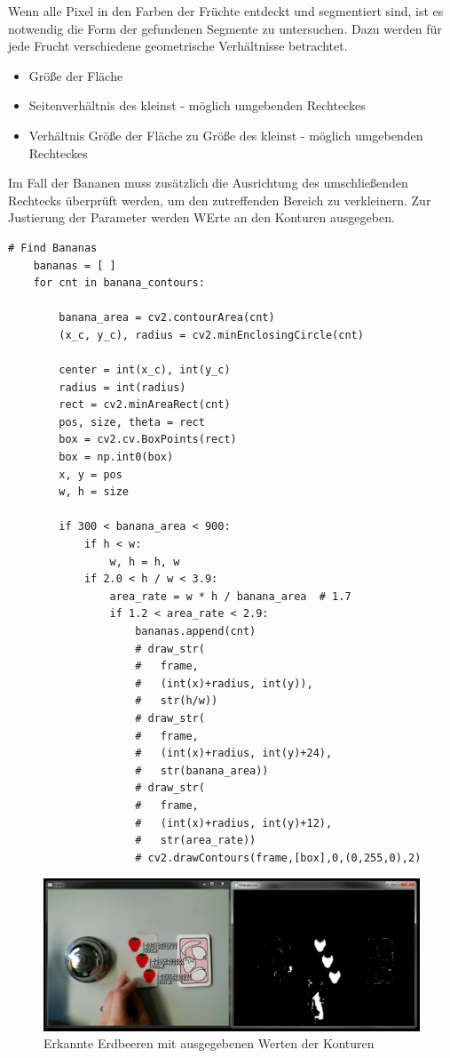 Wenn alle Pixel in den Farben der Früchte entdeckt und segmentiert sind, ist es notwendig die Form der gefundenen Segmente zu untersuchen. Dazu werden für jede Frucht verschiedene geometrische Verhältnisse betrachtet.
\begin{itemize}
    \item Größe der Fläche
    \item Seitenverhältnis des kleinst - möglich umgebenden Rechteckes
    \item Verhältnis Größe der Fläche zu Größe des kleinst - möglich umgebenden Rechteckes
\end{itemize}
Im Fall der Bananen muss zusätzlich die Ausrichtung des umschließenden Rechtecks überprüft werden, um den zutreffenden Bereich zu verkleinern. 
Zur Justierung der Parameter werden WErte an den Konturen ausgegeben.
\lstset{language=Python}
\begin{lstlisting}[]
    # Find Bananas
    bananas = [ ]
    for cnt in banana_contours:

        banana_area = cv2.contourArea(cnt)
        (x_c, y_c), radius = cv2.minEnclosingCircle(cnt)

        center = int(x_c), int(y_c)
        radius = int(radius)
        rect = cv2.minAreaRect(cnt)
        pos, size, theta = rect
        box = cv2.cv.BoxPoints(rect)
        box = np.int0(box)
        x, y = pos
        w, h = size

        if 300 < banana_area < 900:
            if h < w:
                w, h = h, w
            if 2.0 < h / w < 3.9:
                area_rate = w * h / banana_area  # 1.7
                if 1.2 < area_rate < 2.9:
                    bananas.append(cnt)
                    # draw_str(
                    #   frame,
                    #   (int(x)+radius, int(y)),
                    #   str(h/w))
                    # draw_str(
                    #   frame,
                    #   (int(x)+radius, int(y)+24),
                    #   str(banana_area))
                    # draw_str(
                    #   frame,
                    #   (int(x)+radius, int(y)+12),
                    #   str(area_rate))
                    # cv2.drawContours(frame,[box],0,(0,255,0),2)
\end{lstlisting}
\begin{figure}[H]
    \centering
    \includegraphics[width=\textwidth]{Abbildungen/Erdbeeren03}
    \caption[]{Erkannte Erdbeeren mit ausgegebenen Werten der Konturen}
    \label{fig:Erdbeeren03}
\end{figure}
